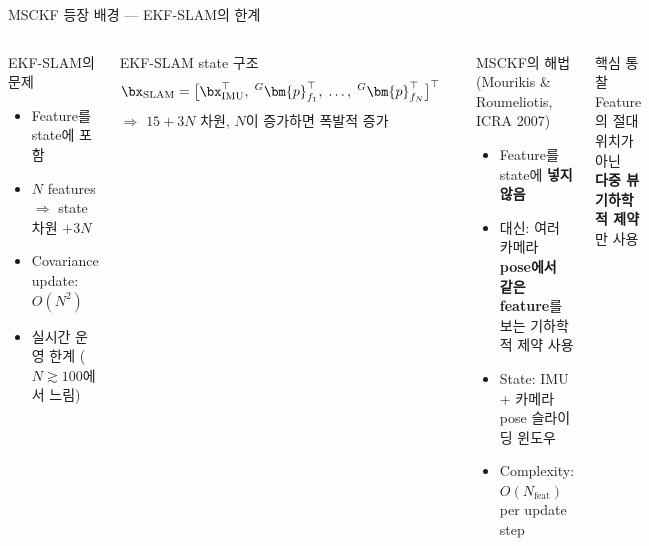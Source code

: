 \begin{frame}{MSCKF 등장 배경 — EKF-SLAM의 한계}
  \begin{columns}[T]
      \begin{block}{EKF-SLAM의 문제}
        \begin{itemize}
          \item Feature를 state에 포함
          \item $N$ features $\Rightarrow$ state 차원 $+3N$
          \item Covariance update: $O(N^2)$
          \item 실시간 운영 한계 ($N \gtrsim 100$에서 느림)
        \end{itemize}
      \end{block}
      \begin{block}{EKF-SLAM state 구조}
        \begin{align*}
          \bx_{\text{SLAM}} &= \bigl[\bx_{\text{IMU}}^\top,\;
                              {}^G\bm{p}_{f_1}^\top,\;\ldots,\;
                              {}^G\bm{p}_{f_N}^\top\bigr]^\top
        \end{align*}
        $\Rightarrow$ $15 + 3N$ 차원, $N$이 증가하면 폭발적 증가
      \end{block}
      \begin{exampleblock}{MSCKF의 해법 (Mourikis \& Roumeliotis, ICRA 2007)}
        \begin{itemize}
          \item Feature를 state에 \textbf{넣지 않음}
          \item 대신: 여러 카메라 \textbf{pose에서 같은 feature}를 보는 기하학적 제약 사용
          \item State: IMU + 카메라 pose 슬라이딩 윈도우
          \item Complexity: $O(N_{\text{feat}})$ per update step
        \end{itemize}
      \end{exampleblock}
      \begin{alertblock}{핵심 통찰}
        Feature의 절대 위치가 아닌\\
        \textbf{다중 뷰 기하학적 제약}만 사용
      \end{alertblock}
  \end{columns}
\end{frame}

